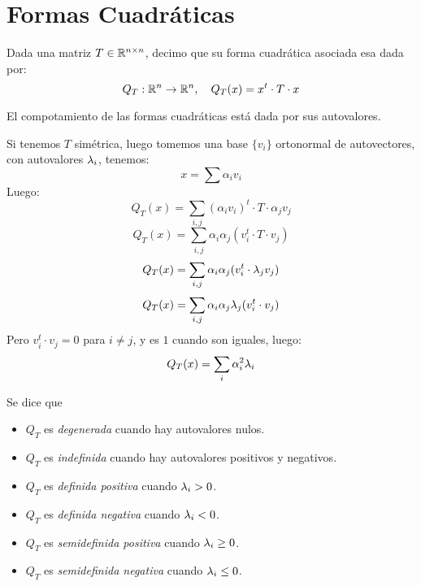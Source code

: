 \documentclass{article}
\begin{document}
    \section*{Formas Cuadráticas}
    \begin{defi}
        Dada una matriz $T \in \mathbb{R}^{n \times n}$, decimo que su forma cuadrática asociada esa dada por:
        \[
            Q_T : \mathbb{R}^n \to \mathbb{R}^n, \quad Q_T(x) = x^t \cdot T \cdot x
        \]
    \end{defi}
    \begin{teo}
        El compotamiento de las formas cuadráticas está dada por sus autovalores.
    \end{teo}
    \begin{demo}
        Si tenemos $T$ simétrica, luego tomemos una base $\{v_i\}$ ortonormal de autovectores, con autovalores $\lambda_i$, tenemos:
        \[
            x = \sum \alpha_i v_i
        \]
        Luego:
        \[
            Q_T(x) = \sum_{i,j} (\alpha_i v_i)^t \cdot T \cdot \alpha_j v_j
        \]
        \[
            Q_T(x) = \sum_{i,j} \alpha_i \alpha_j (v_i^t \cdot T \cdot v_j)
        \]
        \[
            Q_T(x) = \sum_{i,j} \alpha_i \alpha_j (v_i^t \cdot \lambda_j v_j)
        \]
        \[
            Q_T(x) = \sum_{i,j} \alpha_i \alpha_j \lambda_j (v_i^t \cdot v_j)
        \]
        Pero $v_i^t \cdot v_j = 0$ para $i \neq j$, y es $1$ cuando son iguales, luego:
        \[
            Q_T(x) = \sum_i \alpha_i^2 \lambda_i
        \]
    \end{demo}
    \begin{defi}
        Se dice que
        \begin{itemize}
            \item $Q_T$ es \emph{degenerada} cuando hay autovalores nulos.
            \item $Q_T$ es \emph{indefinida} cuando hay autovalores positivos y negativos.
            \item $Q_T$ es \emph{definida positiva} cuando $\lambda_i > 0$.
            \item $Q_T$ es \emph{definida negativa} cuando $\lambda_i < 0$.
            \item $Q_T$ es \emph{semidefinida positiva} cuando $\lambda_i \geq 0$.
            \item $Q_T$ es \emph{semidefinida negativa} cuando $\lambda_i \leq 0$.
        \end{itemize}
    \end{defi}
\end{document}
